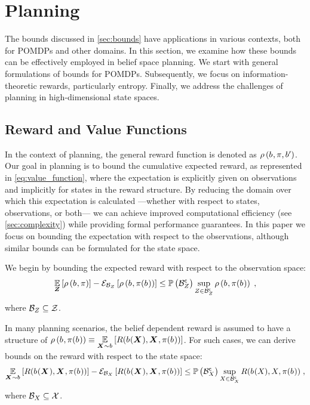 \section{Planning}

The bounds discussed in \cref{sec:bounds} have applications in various contexts, both for POMDPs and other domains. In this section, we examine how these bounds can be effectively employed in belief space planning. We start with general formulations of bounds for POMDPs. Subsequently, we focus on information-theoretic rewards, particularly entropy. Finally, we address the challenges of planning in high-dimensional state spaces.

\subsection{Reward and Value Functions}

In the context of planning, the general reward function is denoted as $\rho\left(b_{},\pi,b_{}^\prime\right)$. Our goal in planning is to bound the cumulative expected reward, as represented in \eqref{eq:value_function}, where the expectation is explicitly given on observations and implicitly for states in the reward structure. By reducing the domain over which this expectation is calculated ---whether with respect to states, observations, or both--- we can achieve improved computational efficiency (see \cref{sec:complexity}) while providing formal performance guarantees. In this paper we focus on bounding the expectation with respect to the observations, although similar bounds can be formulated for the state space.

We begin by bounding the expected reward with respect to the observation space:
\begin{equation}
		\operatorname*{\mathbb{E}}\limits_{\boldsymbol Z_{}}\left[{\rho\left(b_{},\pi\right)}\right]-\mathcal{E}_{\mathcal{B}_{Z_{}}}\left[{\rho\left(b_{},\pi(b_{})\right)}\right]
		\leq\mathbb{P}\left({{\mathcal B}^{\mathsf{c}}_{Z_{}}}\right)\sup_{Z_{}\in{\ensuremath{\mathcal B}}^{\mathsf{c}}_{Z_{}}}\rho\left(b_{},\pi(b_{})\right)\;,
\end{equation}
where $\mathcal{B}_{Z_{}}\subseteq\mathcal Z$.

In many planning scenarios, the belief dependent reward is assumed to have a structure of $\rho\left(b_{},\pi(b_{})\right)\equiv \operatorname*{\mathbb{E}}\limits_{\boldsymbol X_{}\sim b_{}}\left[{R(b_{}(\boldsymbol X_{}),\boldsymbol X_{},\pi(b_{}))}\right]$. For such cases, we can derive bounds on the reward with respect to the state space:
\begin{equation}
		\operatorname*{\mathbb{E}}\limits_{\boldsymbol X_{}\sim b_{}}\left[{R(b_{}(\boldsymbol X_{}),\boldsymbol X_{},\pi(b_{}))}\right]-\mathcal{E}_{\mathcal{B}_{X_{}}}\left[{R(b_{}(\boldsymbol X_{}),\boldsymbol X_{},\pi(b_{}))}\right]
		\leq\mathbb{P}\left({{\mathcal B}^{\mathsf{c}}_{X_{}}}\right)\sup_{X_{}\in{\ensuremath{\mathcal B}}^{\mathsf{c}}_{X_{}}}R(b_{}(X_{}),X_{},\pi(b_{}))\;,
\end{equation}
where $\mathcal{B}_{X_{}}\subseteq\mathcal X$.

